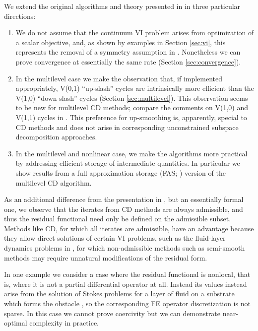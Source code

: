 \documentclass[letterpaper,final,12pt,reqno]{amsart}
\theoremstyle{cstyle}
\theoremstyle{dstyle}
\numberwithin{equation}{section}
\numberwithin{figure}{section}
\numberwithin{table}{section}
\numberwithin{theorem}{section}
\begin{document}
We extend the original algorithms and theory presented in \cite{Tai2003} in three particular directions:
\renewcommand{\labelenumi}{\emph{(\roman{enumi})}}
\begin{enumerate}
\item We do not assume that the continuum VI problem arises from optimization of a scalar objective, and, as shown by examples in Section \ref{sec:vi}, this represents the removal of a symmetry assumption in \cite{Tai2003}.  Nonetheless we can prove convergence at essentially the same rate (Section \ref{sec:convergence}). %
\item In the multilevel case we make the observation that, if implemented appropriately, V(0,1) ``up-slash'' cycles are intrinsically more efficient than the V(1,0) ``down-slash'' cycles (Section \ref{sec:multilevel}).  This observation seems to be new for multilevel CD methods; compare the comments on V(1,0) and V(1,1) cycles in \cite{GraeserKornhuber2009,Tai2003}.  This preference for up-smoothing is, apparently, special to CD methods and does not arise in corresponding unconstrained subspace decomposition \cite{Xu1992} approaches.
\item In the multilevel and nonlinear case, we make the algorithms more practical by addressing efficient storage of intermediate quantities.  In particular we show results from a full approximation storage (FAS; \cite{Brandt1977}) version of the multilevel CD algorithm.
\end{enumerate}

As an additional difference from the presentation in \cite{Tai2003}, but an essentially formal one, we observe that the iterates from CD methods are always admissible, and thus the residual functional need only be defined on the admissible subset.  Methods like CD, for which all iterates are admissible, have an advantage because they allow direct solutions of certain VI problems, such as the fluid-layer dynamics problems in \cite{Bueler2021conservation,JouvetBueler2012}, for which non-admissible methods such as semi-smooth methods \cite{BensonMunson2006} may require unnatural modifications of the residual form.

In one example we consider a case where the residual functional is nonlocal, that is, where it is not a partial differential operator at all.  Instead its values instead arise from the solution of Stokes problems for a layer of fluid on a substrate which forms the obstacle \cite{SayagWorster2013}, so the corresponding FE operator discretization is not sparse.  In this case we cannot prove coercivity but we can demonstrate near-optimal complexity in practice.  %
\end{document}
